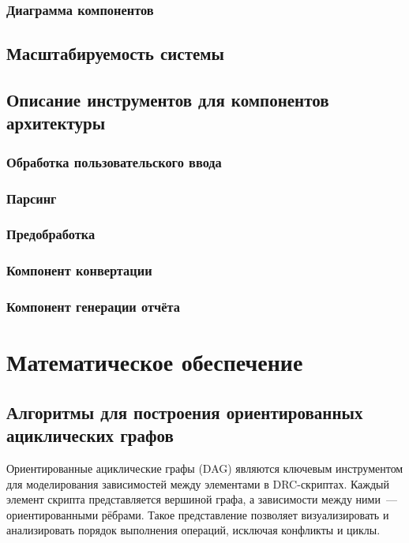 \subsubsection{Диаграмма компонентов}

\subsection{Масштабируемость системы}

\subsection{Описание инструментов для компонентов архитектуры}

\subsubsection{Обработка пользовательского ввода}

\subsubsection{Парсинг}

\subsubsection{Предобработка}

\subsubsection{Компонент конвертации}

\subsubsection{Компонент генерации отчёта}

\section{Математическое обеспечение}

\subsection{Алгоритмы для построения ориентированных ациклических графов}
\label{section:algs:dag}

Ориентированные ациклические графы (DAG) являются ключевым инструментом
для моделирования зависимостей между элементами в DRC-скриптах.
Каждый элемент скрипта представляется вершиной графа,
а зависимости между ними~--- ориентированными рёбрами.
Такое представление позволяет визуализировать
и анализировать порядок выполнения операций, исключая конфликты и циклы.

